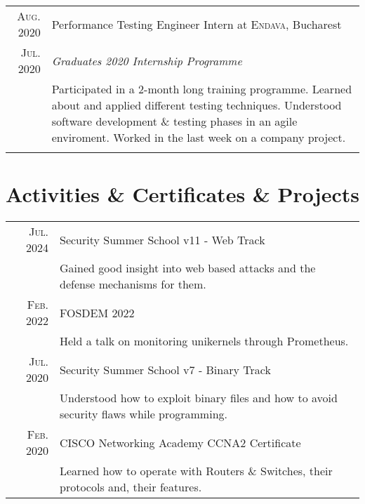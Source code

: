 \documentclass[a4paper,10pt]{article}
\begin{document}
\begin{tabular}{r|p{15cm}}
	\textsc{Aug. 2020} & Performance Testing Engineer Intern at \textsc{Endava}, Bucharest \\
	\textsc{Jul. 2020}&\emph{Graduates 2020 Internship Programme}\\&
	\footnotesize
	{
		Participated in a 2-month long training programme.
		Learned about and applied different testing techniques.
		Understood software development \& testing phases in an agile enviroment.
		Worked in the last week on a company project.
	} \\
	\multicolumn{2}{c}{} \\
\end{tabular}


\section{Activities \& Certificates \& Projects }
\begin{tabular}{rl}
	\textsc{Jul.} 2024 & Security Summer School v11 - Web Track \\&
		\textbullet\enspace\enspace Gained good insight into web based attacks and the defense mechanisms for them. \\
	\textsc{Feb.} 2022 & FOSDEM 2022 \\&
		\textbullet\enspace\enspace Held a talk on monitoring unikernels through Prometheus. \\
	\textsc{Jul.} 2020 & Security Summer School v7 - Binary Track \\&
		\textbullet\enspace\enspace Understood how to exploit binary files and how to avoid security flaws while programming. \\
	\textsc{Feb.} 2020 & CISCO Networking Academy CCNA2 Certificate \\&
		\textbullet\enspace\enspace Learned how to operate with Routers \& Switches, their protocols and, their features.
\end{tabular}
\end{document}
